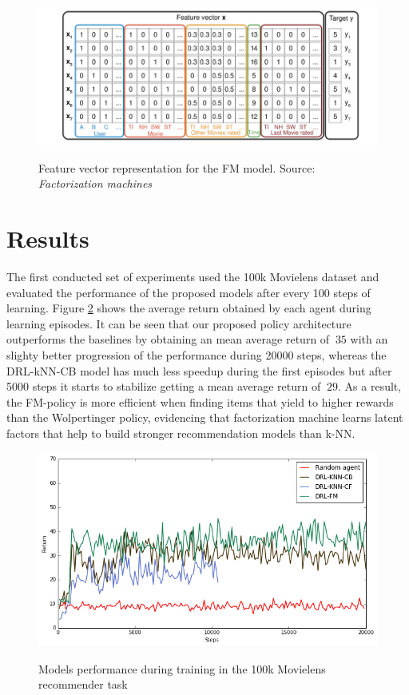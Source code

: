 \begin{figure}[h]
\centering
\caption{Feature vector representation for the FM model. Source: \textit{Factorization machines} \cite{rendle2010factorization}}
\includegraphics[scale=0.9]{images/featurevectors}
\label{fig:featurevector}
\end{figure}

\section{Results}

The first conducted set of experiments used the 100k Movielens dataset and evaluated the performance of the proposed models after every 100 steps of learning.  Figure \ref{fig:return_train} shows the average return obtained by each agent during learning episodes. It can be seen that our proposed policy architecture outperforms the baselines by obtaining an mean average return of $~ 35$ with an slighty better progression of the performance during 20000 steps, whereas the DRL-kNN-CB model has much less speedup during the first episodes but after 5000 steps it starts to stabilize getting a mean average return of $~ 29$. As a result, the FM-policy is more efficient when finding items that yield to higher rewards than the Wolpertinger policy, evidencing that factorization machine learns latent factors that help to build stronger recommendation models than k-NN.

\begin{figure}[!htbp]
\centering
\caption{Models performance during training in the 100k Movielens recommender task}
\includegraphics[scale=0.6]{images/eval_return_train}
\label{fig:return_train}
\end{figure}

